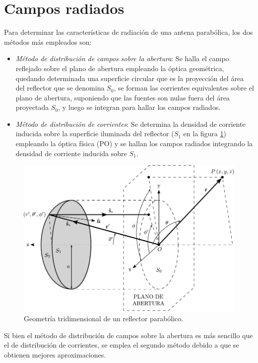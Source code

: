 \section{Campos radiados}
\label{sec_principios_cam_rad}

Para determinar las características de radiación de una antena parabólica, los dos métodos más empleados son:
\begin{itemize}
\item \emph{Método de distribución de campos sobre la abertura}: Se halla el campo reflejado sobre el plano de abertura empleando la óptica geométrica, quedando determinada una superficie circular que es la proyección del área del reflector que se denomina $S_0$, se forman las corrientes equivalentes sobre el plano de abertura, suponiendo que las fuentes son nulas fuera del área proyectada $S_0$, y luego se integran para hallar los campos radiados.
\item \emph{Método de distribución de corrientes}: Se determina la densidad de corriente inducida sobre la superficie iluminada del reflector ($S_1$ en la figura \ref{fig_principios:3}) empleando la óptica física (PO) y se hallan los campos radiados integrando la densidad de corriente inducida sobre $S_1$.
\end{itemize}
\begin{figure}[H]
\centering
\includegraphics[scale = 1]{Figures/Principios/principios_3}
\caption{Geometría tridimensional de un reflector parabólico.}
\label{fig_principios:3}
\end{figure}
Si bien el método de distribución de campos sobre la abertura es más sencillo que el de distribución de corrientes, se emplea el segundo método debido a que se obtienen mejores aproximaciones.

